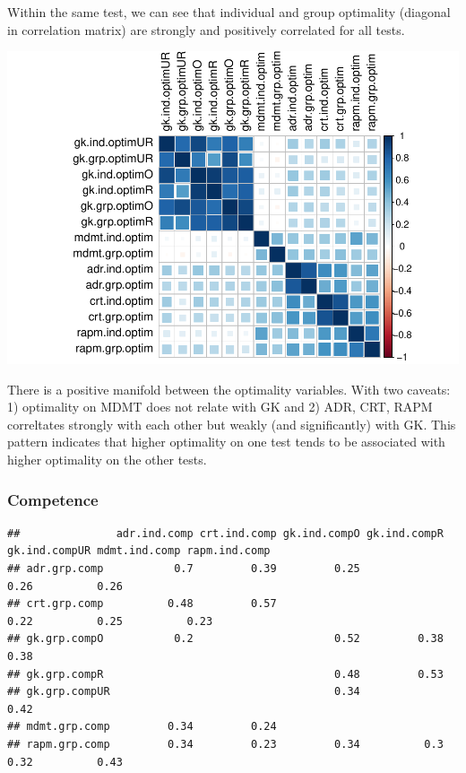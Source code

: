 \documentclass[]{article}
\begin{document}
Within the same test, we can see that individual and group optimality
(diagonal in correlation matrix) are strongly and positively correlated
for all tests.

\includegraphics{corr_analyses_files/figure-latex/optimality2-1.pdf}

There is a positive manifold between the optimality variables. With two
caveats: 1) optimality on MDMT does not relate with GK and 2) ADR, CRT,
RAPM correltates strongly with each other but weakly (and significantly)
with GK. This pattern indicates that higher optimality on one test tends
to be associated with higher optimality on the other tests.

\subsubsection{Competence}\label{competence}

\begin{verbatim}
##               adr.ind.comp crt.ind.comp gk.ind.compO gk.ind.compR gk.ind.compUR mdmt.ind.comp rapm.ind.comp
## adr.grp.comp           0.7         0.39         0.25                       0.26          0.26              
## crt.grp.comp          0.48         0.57                                    0.22          0.25          0.23
## gk.grp.compO           0.2                      0.52         0.38          0.38                            
## gk.grp.compR                                    0.48         0.53                                          
## gk.grp.compUR                                   0.34                       0.42                            
## mdmt.grp.comp         0.34         0.24                                                                    
## rapm.grp.comp         0.34         0.23         0.34          0.3                        0.32          0.43
\end{verbatim}
\end{document}
